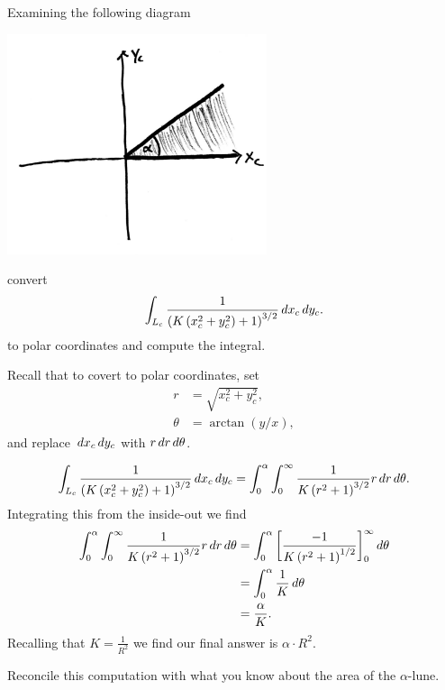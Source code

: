 \documentclass{ximera}
\begin{document}
\begin{problem}
  Examining the following diagram
  \begin{image}
    \includegraphics[width=3in]{halfLune.png}
  \end{image}
  convert
  \[
  \int_{L_c} \frac{1}{\left(K\left(x_c^2+y_c^2\right)+1\right)^{3/2}} \,d x_c\,d y_c.
  \]
  to polar coordinates and compute the integral.
  \begin{hint}
    Recall that to covert to polar coordinates, set
    \begin{align*}
      r &= \sqrt{x_c^2+y_c^2},\\
      \theta &= \arctan(y/x),
    \end{align*}
    and replace $\,d x_c\,d y_c$ with $r\,d r\,d \theta$.
  \end{hint}
  \begin{freeResponse}
    \[
    \int_{L_c}
    \frac{1}{\left(K\left(x_c^2+y_c^2\right)+1\right)^{3/2}} \,d x_c\,d
    y_c = \int_0^\alpha \int_0^\infty \frac{1}{K\left(r^2+1\right)^{3/2}} r\,d r \,d \theta.
    \]
    Integrating this from the inside-out we find
    \begin{align*}
      \int_0^\alpha \int_0^\infty \frac{1}{K\left(r^2+1\right)^{3/2}} r\,d r \,d \theta &= \int_0^\alpha \bigg[ \frac{-1}{K\left(r^2+1\right)^{1/2}} \bigg]_0^\infty \,d \theta\\
      &= \int_0^\alpha \frac{1}{K} \,d \theta\\
      &= \frac{\alpha}{K}.   
    \end{align*}
    Recalling that $K = \frac{1}{R^2}$ we find our final answer is $\alpha \cdot R^2$.
  \end{freeResponse}
\end{problem}

\begin{problem}
  Reconcile this computation with what you know about the area of the
  $\alpha$-lune.
\end{problem}
\end{document}
